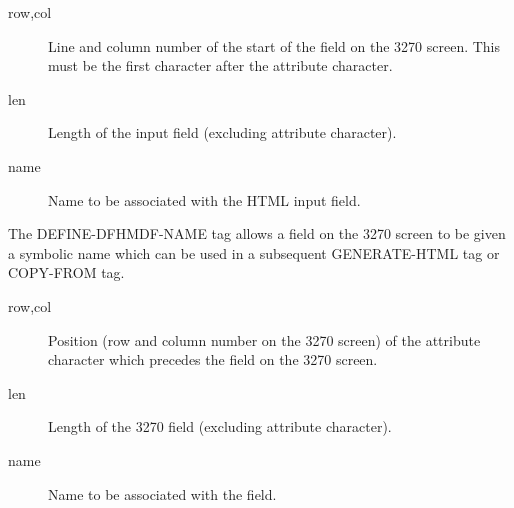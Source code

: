 \documentclass[letterpaper,10pt,english]{sphinxmanual}
\begin{document}
\begin{sphinxVerbatim}[commandchars=\\\{\}]
     
\end{sphinxVerbatim}
\begin{description}
\item[{row,col}] \leavevmode
Line and column number of the start of the field on the 3270 screen.
This must be the first character after the attribute character.

\item[{len}] \leavevmode
Length of the input field (excluding attribute character).

\item[{name}] \leavevmode
Name to be associated with the HTML input field.

\end{description}


The DEFINE-DFHMDF-NAME tag allows a field on the 3270 screen to be given a symbolic name which can be used in a
subsequent GENERATE-HTML tag or COPY-FROM tag.

\begin{sphinxVerbatim}[commandchars=\\\{\}]
     
\end{sphinxVerbatim}
\begin{description}
\item[{row,col}] \leavevmode
Position (row and column number on the 3270 screen) of the attribute character which precedes the field on the 3270 screen.

\item[{len}] \leavevmode
Length of the 3270 field (excluding attribute character).

\item[{name}] \leavevmode
Name to be associated with the field.

\end{description}
\end{document}
